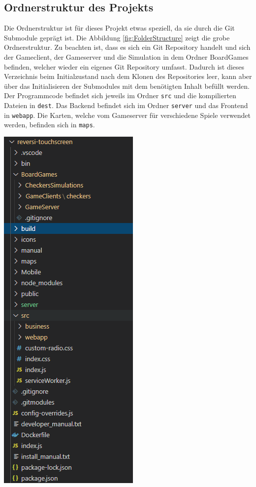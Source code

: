 \documentclass[12pt,a4paper,bibliography=totocnumbered,listof=totocnumbered]{article}
\begin{document}
\begin{appendix}
\pagebreak

\section{Ordnerstruktur des Projekts}
Die Ordnerstruktur ist für dieses Projekt etwas speziell, da sie durch die Git Submodule geprägt ist.
Die Abbildung \ref{fig:FolderStructure} zeigt die grobe Ordnerstruktur. Zu beachten ist, dass es sich ein Git Repository handelt und sich
der Gameclient, der Gameserver und die Simulation in dem Ordner BoardGames befinden, welcher wieder ein eigenes Git Repository umfasst. 
Dadurch ist dieses Verzeichnis beim Initialzustand nach dem Klonen des Repositories leer, kann aber über das Initialisieren der Submodules 
mit dem benötigten Inhalt befüllt werden. Der Programmcode befindet sich jeweils im Ordner \texttt{src} und die kompilierten Dateien 
in \texttt{dest}. Das Backend befindet sich im Ordner \texttt{server} und das Frontend in \texttt{webapp}. Die Karten, welche vom Gameserver 
für verschiedene Spiele verwendet werden, befinden sich in \texttt{maps}.

\vspace{1em}
\begin{minipage}{\linewidth}
	\centering
	\includegraphics[width=0.3\linewidth]{pics/FolderStructure.png}
    \label{fig:FolderStructure}
\end{minipage}

\pagebreak


\end{appendix}
\end{document}
